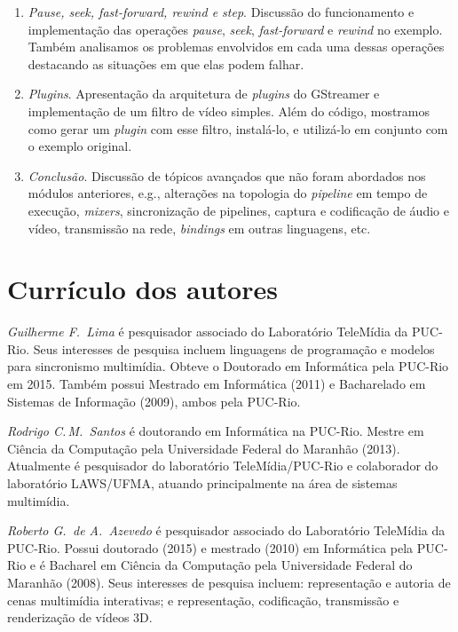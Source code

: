 \documentclass{SBCbookchapter}
\begin{document}
\begin{enumerate}
\item\emph{Pause, seek, fast-forward, rewind e step}.  Discussão do
  funcionamento e implementação das operações \emph{pause}, \emph{seek},
  \emph{fast-forward} e \emph{rewind} no exemplo.  Também analisamos os
  problemas envolvidos em cada uma dessas operações destacando as situações
  em que elas podem falhar.

\item\emph{Plugins}.  Apresentação da arquitetura de \emph{plugins} do
  GStreamer e implementação de um filtro de vídeo simples.  Além do código,
  mostramos como gerar um \emph{plugin} com esse filtro, instalá-lo, e
  utilizá-lo em conjunto com o exemplo original.

\item\emph{Conclusão}.  Discussão de tópicos avançados que não foram
  abordados nos módulos anteriores, e.g., alterações na topologia do
  \emph{pipeline} em tempo de execução, \emph{mixers}, sincronização de
  pipelines, captura e codificação de áudio e vídeo, transmissão na rede,
  \emph{bindings} em outras linguagens, etc.
\end{enumerate}


\section{Currículo dos autores}

\noindent\emph{Guilherme F.~Lima} é pesquisador associado do Laboratório
TeleMídia da PUC-Rio.  Seus interesses de pesquisa incluem linguagens de
programação e modelos para sincronismo multimídia.  Obteve o Doutorado em
Informática pela PUC-Rio em 2015.  Também possui Mestrado em Informática
(2011) e Bacharelado em Sistemas de Informação (2009), ambos pela PUC-Rio.

\noindent\emph{Rodrigo C.\,M.~Santos} é doutorando em Informática na
PUC-Rio.  Mestre em Ciência da Computação pela Universidade Federal do
Maranhão (2013).  Atualmente é pesquisador do laboratório TeleMídia/PUC-Rio
e colaborador do laboratório LAWS/UFMA, atuando principalmente na área de
sistemas multimídia.

\noindent\emph{Roberto G.\, de A.~Azevedo} é pesquisador associado do
Laboratório TeleMídia da PUC-Rio. Possui doutorado (2015) e mestrado (2010) em
Informática pela PUC-Rio e é Bacharel em Ciência da Computação pela
Universidade Federal do Maranhão (2008). Seus interesses de pesquisa incluem:
representação e autoria de cenas multimídia interativas; e representação,
codificação, transmissão e renderização de vídeos 3D.
\end{document}
